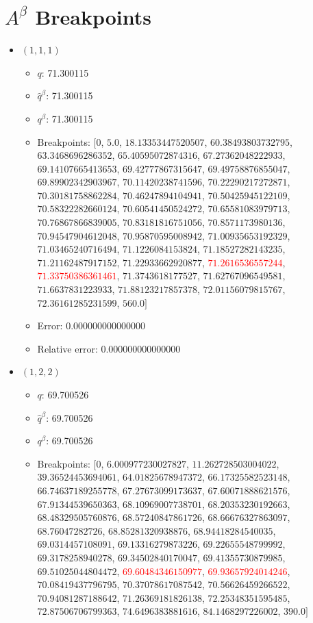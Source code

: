 \documentclass{article}%
\begin{document}
\section{$A^\beta$ Breakpoints}%
\thispagestyle{plain}%
\begin{itemize}%
	\item $(1, 1, 1)$%
	\begin{itemize}%
		\item $q$: 71.300115%
		\item $\hat{q}^\beta$: 71.300115%
		\item $q^\beta$: 71.300115%
		\item Breakpoints: $[$$0$, $5.0$, $18.13353447520507$, $60.38493803732795$, $63.3468696286352$, $65.40595072874316$, $67.27362048222933$, $69.14107665413653$, $69.42777867315647$, $69.49758876855047$, $69.89902342903967$, $70.11420238741596$, $70.22290217272871$, $70.30181758862284$, $70.46247894104941$, $70.50425945122109$, $70.58322282660124$, $70.60541450524272$, $70.65581083979713$, $70.76867866839005$, $70.83181816751056$, $70.8571173980136$, $70.94547904612048$, $70.95870595008942$, $71.00935653192329$, $71.03465240716494$, $71.1226084153824$, $71.18527282143235$, $71.21162487917152$, $71.22933662920877$, \textcolor{red}{$71.2616536557244$}, \textcolor{red}{$71.33750386361461$}, $71.3743618177527$, $71.62767096549581$, $71.6637831223933$, $71.88123217857378$, $72.01156079815767$, $72.36161285231599$, $560.0$$]$%
		\item Error: 0.000000000000000%
		\item Relative error: 0.000000000000000%
	\end{itemize}%
	\item $(1, 2, 2)$%
	\begin{itemize}%
		\item $q$: 69.700526%
		\item $\hat{q}^\beta$: 69.700526%
		\item $q^\beta$: 69.700526%
		\item Breakpoints: $[$$0$, $6.000977230027827$, $11.262728503004022$, $39.36524453694061$, $64.01825678947372$, $66.17325582523148$, $66.74637189255778$, $67.27673099173637$, $67.60071888621576$, $67.91344539650363$, $68.10969007738701$, $68.20353230192663$, $68.48329505760876$, $68.57240847861726$, $68.66676327863097$, $68.76047282726$, $68.85281320938876$, $68.94418284540035$, $69.0314457108091$, $69.13316279873226$, $69.22655548799992$, $69.3178258940278$, $69.34502840170047$, $69.41355730879985$, $69.51025044804472$, \textcolor{red}{$69.60484346150977$}, \textcolor{red}{$69.93657924014246$}, $70.08419437796795$, $70.37078617087542$, $70.56626459266522$, $70.94081287188642$, $71.26369181826138$, $72.25348351595485$, $72.87506706799363$, $74.6496383881616$, $84.1468297226002$, $390.0$$]$%

\end{itemize}
\end{itemize}
\end{document}

